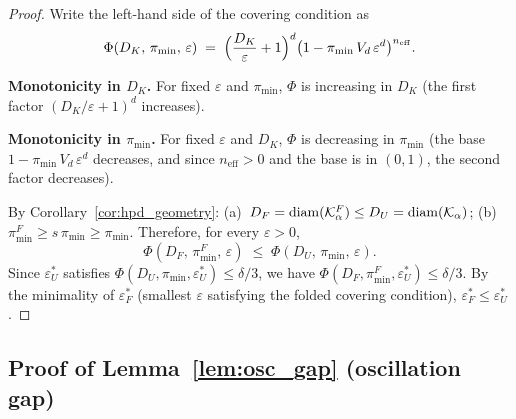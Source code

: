 \begin{proof}
  Write the left-hand side of the covering condition as
  \[
    \Phi(D_K,\, \pi_{\min},\, \varepsilon)
    \;=\;
    \Bigl(\frac{D_K}{\varepsilon} + 1\Bigr)^d
    \bigl(1 - \pi_{\min}\,V_d\,\varepsilon^d\bigr)^{n_{\mathrm{eff}}}.
  \]

  \textbf{Monotonicity in $D_K$.}
  For fixed $\varepsilon$ and $\pi_{\min}$,
  $\Phi$ is increasing in $D_K$
  (the first factor $(D_K/\varepsilon + 1)^d$ increases).

  \textbf{Monotonicity in $\pi_{\min}$.}
  For fixed $\varepsilon$ and $D_K$,
  $\Phi$ is decreasing in $\pi_{\min}$
  (the base $1 - \pi_{\min}\,V_d\,\varepsilon^d$ decreases,
  and since $n_{\mathrm{eff}} > 0$ and the base is in $(0,1)$,
  the second factor decreases).

  By Corollary~\ref{cor:hpd_geometry}:
  (a)~$D_F = \mathrm{diam}(\mathcal{K}_\alpha^F) \leq D_U = \mathrm{diam}(\mathcal{K}_\alpha)$;
  (b)~$\pi_{\min}^F \geq s\,\pi_{\min} \geq \pi_{\min}$.
  Therefore, for every $\varepsilon > 0$,
  \[
    \Phi(D_F,\, \pi_{\min}^F,\, \varepsilon)
    \;\leq\;
    \Phi(D_U,\, \pi_{\min},\, \varepsilon).
  \]
  Since $\varepsilon_U^*$ satisfies
  $\Phi(D_U, \pi_{\min}, \varepsilon_U^*) \leq \delta/3$,
  we have
  $\Phi(D_F, \pi_{\min}^F, \varepsilon_U^*) \leq \delta/3$.
  By the minimality of $\varepsilon_F^*$ (smallest $\varepsilon$
  satisfying the folded covering condition),
  $\varepsilon_F^* \leq \varepsilon_U^*$.
\end{proof}


\subsection{Proof of Lemma~\ref{lem:osc_gap} (oscillation gap)}
\label{app:proof_osc_gap}

